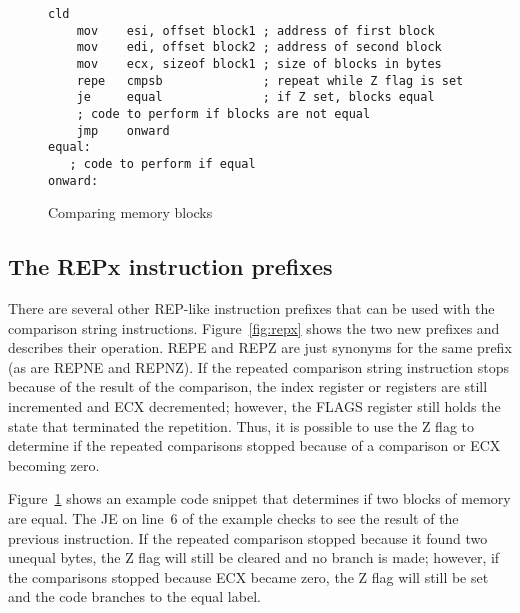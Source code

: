 \begin{figure}
\begin{lstlisting}[language={[x86masm]Assembler},frame=single]
    cld
    mov    esi, offset block1 ; address of first block
    mov    edi, offset block2 ; address of second block
    mov    ecx, sizeof block1 ; size of blocks in bytes
    repe   cmpsb              ; repeat while Z flag is set
    je     equal              ; if Z set, blocks equal
    ; code to perform if blocks are not equal
    jmp    onward
equal:
   ; code to perform if equal
onward:
\end{lstlisting}
\caption{Comparing memory blocks\label{fig:cmpBlocksEx}}
\end{figure}

\subsection{The {\code REPx} instruction prefixes}

There are several other {\code REP}-like instruction prefixes that can be
used with the comparison string instructions. Figure~\ref{fig:repx} shows
the two new prefixes and describes their operation. {\code REPE}  and
{\code REPZ} are just synonyms for the same prefix (as are {\code REPNE} 
and {\code REPNZ}). If the repeated comparison string instruction stops
because of the result of the comparison, the index register or registers
are still incremented and ECX decremented; however, the FLAGS register
still holds the state that terminated the repetition. 
 Thus, it is possible
to use the Z flag to determine if the repeated comparisons stopped because
of a comparison or ECX becoming zero.

Figure~\ref{fig:cmpBlocksEx} shows an example code snippet that determines
if two blocks of memory are equal. The {\code JE} on 
line~6 of the example checks to see the result of the
previous instruction. If the repeated comparison stopped because it found
two unequal bytes, the Z flag will still be cleared and no branch is made;
however, if the comparisons stopped because ECX became zero, the Z flag
will still be set and the code branches to the {\code equal} label.
















